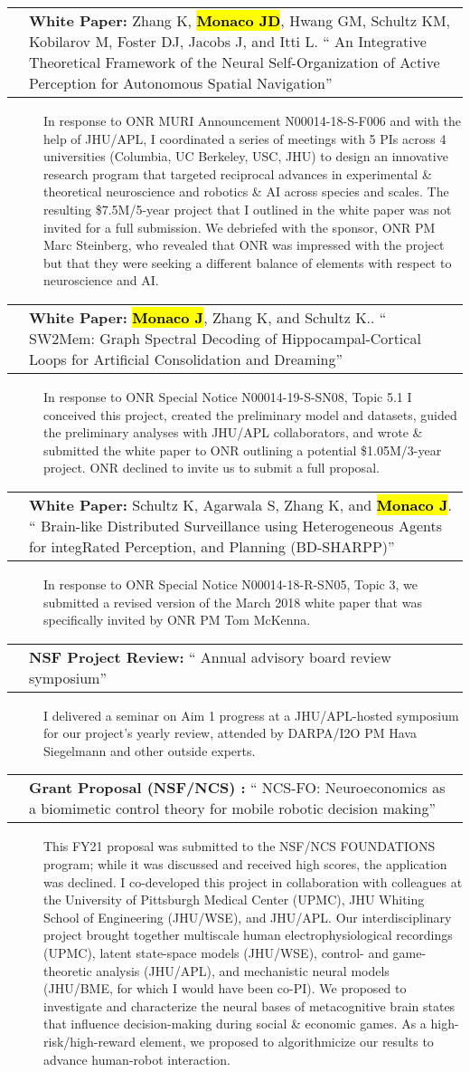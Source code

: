 \documentclass[10pt]{article}
\makeatletter
\newcommand{\unpubtitle}[1]{{\color{hopkinsblue} #1}}
\newcommand{\joehl}[1]{\hl{\textbf{#1}}}
\newcommand{\researchnote}[1]{
  \begin{description}
    \item[] {\hspace{2.2ex}\color{darkgray} #1}
  \end{description}
}
\newcommand{\researchactivity}[4]{
  \begin{minipage}[t]{\textwidth}
    \begin{tabular}{@{\hspace{2ex}}l>{\raggedright\arraybackslash}p{.8\textwidth}}
      \makebox[1.2in][l]{#1} & \textbf{#2:}
      ``\unpubtitle{#3}'' 
    \end{tabular}
  \researchnote{\hspace{1ex} #4}
  \end{minipage}
  \medbreak
}
\newcommand{\whitepaper}[4]{
  \begin{minipage}[t]{\textwidth}
    \begin{tabular}{@{\hspace{2ex}}l>{\raggedright\arraybackslash}p{.8\textwidth}}
      \makebox[1.2in][l]{#1} & \textbf{White Paper:} #2.
      ``\unpubtitle{#3}'' 
    \end{tabular}
  \researchnote{\hspace{1ex} #4}
  \end{minipage}
  \medbreak
}
\makeatother
\begin{document}
\whitepaper
{May--June 2018}
{Zhang K, \joehl{Monaco JD}, Hwang GM, Schultz KM, Kobilarov M, Foster DJ,
Jacobs J, and Itti L}
{An Integrative Theoretical Framework of the Neural Self-Organization of Active
Perception for Autonomous Spatial Navigation}
{In response to ONR MURI Announcement N00014-18-S-F006 and with the help of
  JHU/APL, I coordinated a series of meetings with 5 PIs across 4 universities
  (Columbia, UC Berkeley, USC, JHU) to design an innovative research program that
  targeted reciprocal advances in experimental \& theoretical neuroscience and
  robotics \& AI across species and scales. The resulting \$7.5M/5-year project
  that I outlined in the white paper was not invited for a full submission. We
  debriefed with the sponsor, ONR PM Marc Steinberg, who revealed that ONR was
  impressed with the project but that they were seeking a different balance of
elements with respect to neuroscience and AI.}

\whitepaper
{August 2019}
{\joehl{Monaco J}, Zhang K, and Schultz K.}
{SW2Mem: Graph Spectral Decoding of Hippocampal-Cortical Loops for Artificial
Consolidation and Dreaming}
{In response to ONR Special Notice N00014-19-S-SN08, Topic 5.1 I conceived this
  project, created the preliminary model and datasets, guided the preliminary
  analyses with JHU/APL collaborators, and wrote \& submitted the white paper to
  ONR outlining a potential \$1.05M/3-year project. ONR declined to invite us to
submit a full proposal.}

\whitepaper
{August 2019}
{Schultz K, Agarwala S, Zhang K, and \joehl{Monaco J}}
{Brain-like Distributed Surveillance using Heterogeneous Agents for integRated
Perception, and Planning (BD-SHARPP)}
{In response to ONR Special Notice N00014-18-R-SN05, Topic 3, we submitted a
  revised version of the March 2018 white paper that was specifically invited by
ONR PM Tom McKenna.}

\researchactivity
{Sept. 11, 2019}
{NSF Project Review}
{Annual advisory board review symposium}
{I delivered a seminar on Aim 1 progress at a JHU/APL-hosted symposium for our
  project’s yearly review, attended by DARPA/I2O PM Hava Siegelmann and other
outside experts.}

\researchactivity
{Feb. 26, 2020}
{Grant Proposal (NSF/NCS) }
{NCS-FO: Neuroeconomics as a biomimetic control theory for mobile robotic
decision making}
{This FY21 proposal was submitted to the NSF/NCS FOUNDATIONS program; while
  it was discussed and received high scores, the application was declined. I
  co-developed this project in collaboration with colleagues at the University of
  Pittsburgh Medical Center (UPMC), JHU Whiting School of Engineering (JHU/WSE),
  and JHU/APL. Our interdisciplinary project brought together multiscale human
  electrophysiological recordings (UPMC), latent state-space models (JHU/WSE),
  control- and game-theoretic analysis (JHU/APL), and mechanistic neural models
  (JHU/BME, for which I would have been co-PI). We proposed to investigate and
  characterize the neural bases of metacognitive brain states that influence
  decision-making during social \& economic games. As a high-risk/high-reward
  element, we proposed to algorithmicize our results to advance human-robot
interaction.}
\end{document}
